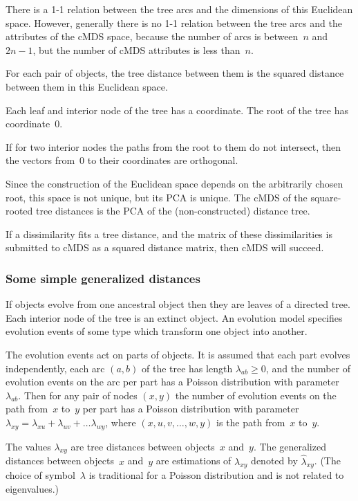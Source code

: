 \documentclass[10pt,a4paper]{article}
\begin{document}
There is a 1-1 relation between the tree arcs and the dimensions of this Euclidean space.
However, generally there is no 1-1 relation between the tree arcs and the attributes of the cMDS space,
because the number of arcs is between~$n$ and $2n-1$, but the number of cMDS attributes is less than~$n$.

For each pair of objects, the tree distance between them is the squared distance between them in this Euclidean space.

Each leaf and interior node of the tree has a coordinate.
The root of the tree has coordinate~0.

If for two interior nodes the paths from the root to them do not intersect, then the vectors from~0 to their coordinates are orthogonal.

Since the construction of the Euclidean space depends on the arbitrarily chosen root, this space is not unique,
but its PCA is unique.
The cMDS of the square-rooted tree distances is the PCA of the (non-constructed) distance tree.

If a dissimilarity fits a tree distance,
and the matrix of these dissimilarities is submitted to cMDS as a squared distance matrix,
then cMDS will succeed.



\subsubsection {Some simple generalized distances}


If objects evolve from one ancestral object then they are leaves of a directed tree.
Each interior node of the tree is an extinct object.
An evolution model specifies evolution events of some type which transform one object into another.

The evolution events act on parts of objects.
It is assumed that each part evolves independently, each arc $(a,b)$ of the tree has length $\lambda_{ab} \ge 0$,
and the number of evolution events on the arc per part has a Poisson distribution with parameter $\lambda_{ab}$.
Then for any pair of nodes $(x,y)$ the number of evolution events on the path from~$x$ to~$y$ per part has a Poisson distribution with parameter
$\lambda_{xy} = \lambda_{xu} + \lambda_{uv} + \dots \lambda_{wy}$,
where $(x, u, v, \dots, w, y)$ is the path from~$x$ to~$y$.

The values $\lambda_{xy}$ are tree distances between objects~$x$ and~$y$.
The generalized distances between objects~$x$ and~$y$ are estimations of $\lambda_{xy}$
denoted by $\hat \lambda_{xy}$.
(The choice of symbol~$\lambda$ is traditional for a Poisson distribution and is not related to eigenvalues.)
\end{document}
